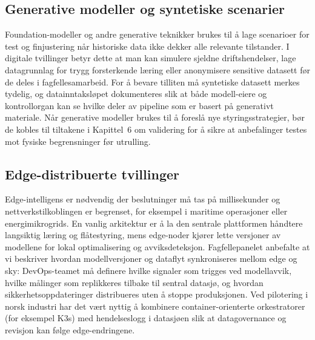 \subsection{Generative modeller og syntetiske scenarier}
Foundation-modeller og andre generative teknikker brukes til å lage scenarioer for test og finjustering når historiske data ikke dekker alle relevante tilstander.\citep{bommasani2021opportunities} I digitale tvillinger betyr dette at man kan simulere sjeldne driftshendelser, lage datagrunnlag for trygg forsterkende læring eller anonymisere sensitive datasett før de deles i fagfellesamarbeid. For å bevare tilliten må syntetiske datasett merkes tydelig, og datainntaksløpet dokumenteres slik at både modell-eiere og kontrollorgan kan se hvilke deler av pipeline som er basert på generativt materiale. Når generative modeller brukes til å foreslå nye styringsstrategier, bør de kobles til tiltakene i Kapittel~6 om validering for å sikre at anbefalinger testes mot fysiske begrensninger før utrulling.

\subsection{Edge-distribuerte tvillinger}
Edge-intelligens er nødvendig der beslutninger må tas på millisekunder og nettverkstilkoblingen er begrenset, for eksempel i maritime operasjoner eller energimikrogrids.\citep{shi2016edge} En vanlig arkitektur er å la den sentrale plattformen håndtere langsiktig læring og flåtestyring, mens edge-noder kjører lette versjoner av modellene for lokal optimalisering og avviksdeteksjon. Fagfellepanelet anbefalte at vi beskriver hvordan modellversjoner og dataflyt synkroniseres mellom edge og sky: DevOps-teamet må definere hvilke signaler som trigges ved modellavvik, hvilke målinger som replikkeres tilbake til sentral datasjø, og hvordan sikkerhetsoppdateringer distribueres uten å stoppe produksjonen. Ved pilotering i norsk industri har det vært nyttig å kombinere container-orienterte orkestratorer (for eksempel K3s) med hendelseslogg i datasjøen slik at datagovernance og revisjon kan følge edge-endringene.

